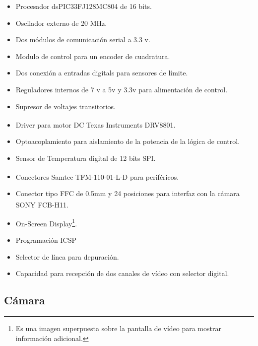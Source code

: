 \begin{itemize}
    \item Procesador dsPIC33FJ128MC804 de 16 bits.
    \item Oscilador externo de 20 MHz.
    \item Dos m\'{o}dulos de comunicaci\'{o}n serial a 3.3 v.
    \item Modulo de control para un encoder de cuadratura.
    \item Dos conexi\'{o}n a entradas digitals para sensores de l\'{i}mite. 
    \item Reguladores internos de 7 v a 5v y 3.3v para alimentaci\'{o}n de control.
    \item Supresor de voltajes transitorios.
    \item Driver para motor DC Texas Instruments\textsuperscript{\textregistered} DRV8801.
    \item Optoacoplamiento para aislamiento de la potencia de la l\'{o}gica de control.
    \item Sensor de Temperatura digital de 12 bits SPI.
    \item Conectores Samtec\textsuperscript{\textregistered} TFM-110-01-L-D para perif\'{e}ricos.
    \item Conector tipo FFC de 0.5mm y 24 posiciones para interfaz con la c\'{a}mara SONY\textsuperscript{\textregistered} FCB-H11. 
    \item On-Screen Display\footnote{Es una imagen superpuesta sobre la pantalla de v\'{i}deo para mostrar informaci\'{o}n adicional.}.
    \item Programaci\'{o}n ICSP  
    \item Selector de l\'{i}nea para depuraci\'{o}n. 
    \item Capacidad para recepci\'{o}n de dos canales de v\'{i}deo con selector digital.
\end{itemize}


\subsection{C\'{a}mara}

